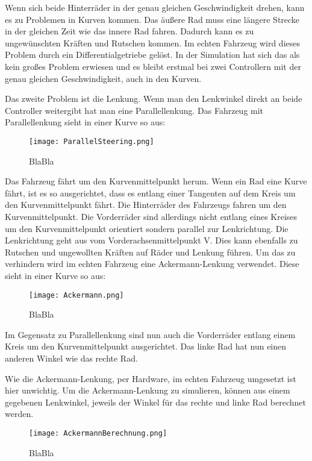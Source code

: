 Wenn sich beide Hinterräder in der genau gleichen Geschwindigkeit drehen, kann es zu Problemen in Kurven kommen.
Das äußere Rad muss eine längere Strecke in der gleichen Zeit wie das innere Rad fahren. 
Dadurch kann es zu ungewünschten Kräften und Rutschen kommen.
Im echten Fahrzeug wird dieses Problem durch ein Differentialgetriebe gelöst.
In der Simulation hat sich das als kein großes Problem erwiesen und es bleibt erstmal bei zwei Controllern mit der genau gleichen Geschwindigkeit, auch in den Kurven.

Das zweite Problem ist die Lenkung. 
Wenn man den Lenkwinkel direkt an beide Controller weitergibt hat man eine Parallellenkung.
Das Fahrzeug mit Parallellenkung sieht in einer Kurve so aus:  
\begin{wrapfigure}{r}{.4\textwidth}
    \centering
    \texttt{[image: ParallelSteering.png]}
    \vspace{-15pt}
    \caption{BlaBla\footnotemark}
\end{wrapfigure}
Das Fahrzeug fährt um den Kurvenmittelpunkt herum. 
Wenn ein Rad eine Kurve fährt, ist es so ausgerichtet, dass es entlang einer Tangenten auf dem Kreis um den Kurvenmittelpunkt fährt.
Die Hinterräder des Fahrzeugs fahren um den Kurvenmittelpunkt.
Die Vorderräder sind allerdings nicht entlang eines Kreises um den Kurvenmittelpunkt orientiert sondern parallel zur Lenkrichtung.
Die Lenkrichtung geht aus vom Vorderachsenmittelpunkt V.
Dies kann ebenfalls zu Rutschen und ungewollten Kräften auf Räder und Lenkung führen.
Um das zu verhindern wird im echten Fahrzeug eine Ackermann-Lenkung verwendet. 
Diese sieht in einer Kurve so aus:
\begin{wrapfigure}{r}{.4\textwidth}
    \centering
    \texttt{[image: Ackermann.png]}
    \vspace{-15pt}
    \caption{BlaBla\footnotemark}
\end{wrapfigure}
Im Gegensatz zu Parallellenkung sind nun auch die Vorderräder entlang einem Kreis um den Kurvenmittelpunkt ausgerichtet.
Das linke Rad hat nun einen anderen Winkel wie das rechte Rad.

Wie die Ackermann-Lenkung, per Hardware, im echten Fahrzeug umgesetzt ist hier unwichtig.
Um die Ackermann-Lenkung zu simulieren, können aus einem gegebenen Lenkwinkel, jeweils der Winkel für das rechte und linke Rad berechnet werden.

\begin{wrapfigure}{r}{.4\textwidth}
    \centering
    \texttt{[image: AckermannBerechnung.png]}
    \vspace{-15pt}
    \caption{BlaBla}
\end{wrapfigure}

